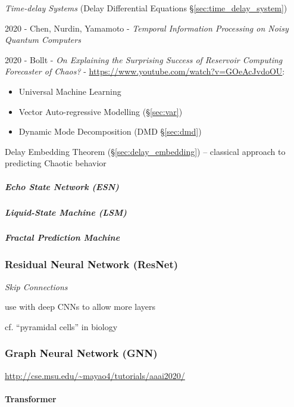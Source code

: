 \emph{Time-delay Systems} (Delay Differential Equations
\S\ref{sec:time_delay_system})

2020 - Chen, Nurdin, Yamamoto - \emph{Temporal Information Processing on Noisy
  Quantum Computers}

2020 - Bollt - \emph{On Explaining the Surprising Success of Reservoir Computing
  Forecaster of Chaos?} - \url{https://www.youtube.com/watch?v=GOeAcJvdoOU}:

\begin{itemize}
  \item Universal Machine Learning
  \item Vector Auto-regressive Modelling (\S\ref{sec:var})
  \item Dynamic Mode Decomposition (DMD \S\ref{sec:dmd})
\end{itemize}

Delay Embedding Theorem (\S\ref{sec:delay_embedding}) -- classical approach to
predicting Chaotic behavior



\subparagraph{Echo State Network (ESN)}\label{sec:esn}\hfill

\subparagraph{Liquid-State Machine (LSM)}\label{sec:liquid_state}\hfill

\subparagraph{Fractal Prediction Machine}
\label{sec:fractal_prediction_machine}\hfill



\subsubsection{Residual Neural Network (ResNet)}\label{sec:resnet}

\emph{Skip Connections}

use with deep CNNs to allow more layers

cf. ``pyramidal cells'' in biology



\subsubsection{Graph Neural Network (GNN)}\label{sec:gnn}

\url{http://cse.msu.edu/~mayao4/tutorials/aaai2020/}



\paragraph{Transformer}\label{sec:transformer}\hfill

